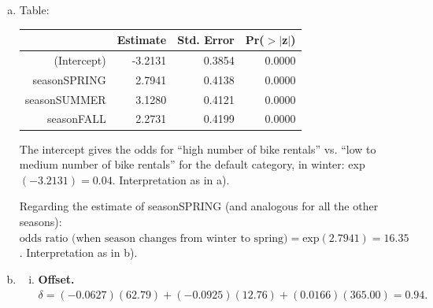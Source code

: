 {\begin{enumerate}[a)]
    and for fall:
    \[
    \text{odds ratio} 
    = \frac{P(y=1\, | \,\texttt{season}=\text{FALL})\,/\,P(y=0\, | \,\texttt{season}=\text{FALL})}{P(y=1\, | \,\texttt{season}=\text{WINTER})\,/\,P(y=0\, | \,\texttt{season}=\text{WINTER})}
    = \frac{50/128}{7/174} = 9.71.
    \]
    
	\textbf{Interpretation:} The chances (the odds) of having "high bike rentals" are $16.35$ times higher in season SPRING compared to the reference category (WINTER).
    As in winter the odds of ``$y=0$'' are $25:1$, this means in spring they are roughly $(25:16):1$, which means roughly $5:3$.
    Similarly, in summer the odds are $22.83$ times higher than in winter, which means that in summer they are close to $1:1$ (since in winter they were $1:25$), so the chances in summer are roughly 50-50.

	\item\label{ex_sol:logreg_GLM_single_feature}
    Table:
	\begin{table}[!ht]
		\centering
		\begin{tabular}{rrrr}
			\hline
			& Estimate & Std. Error & Pr($>$$|$z$|$) \\ 
			\hline
			(Intercept) & -3.2131 & 0.3854 & 0.0000 \\ 
			seasonSPRING & 2.7941 & 0.4138 & 0.0000 \\ 
			seasonSUMMER & 3.1280 & 0.4121 & 0.0000 \\ 
			seasonFALL & 2.2731 & 0.4199 & 0.0000 \\ 
			\hline
		\end{tabular}
	\end{table}

	The intercept gives the odds for ``high number of bike rentals'' vs. ``low to medium number of bike rentals'' for the default category, in winter: exp$(-3.2131) = 0.04$. Interpretation as in a).
	
	Regarding the estimate of seasonSPRING (and analogous for all the other seasons): $\text{odds ratio (when season changes from winter to spring)} = \text{exp}(2.7941) =  16.35$. Interpretation as in b).

    \item\label{ex_sol:logreg_GLM_more_features}

    \begin{enumerate}[(i)]
    
        \item\textbf{Offset.}
        $
        \delta=
        (-0.0627)(62.79)
        +(-0.0925)(12.76)
        +(0.0166)(365.00)
        =\boxed{0.94}.
        $
        

\end{enumerate}
\end{enumerate}}
